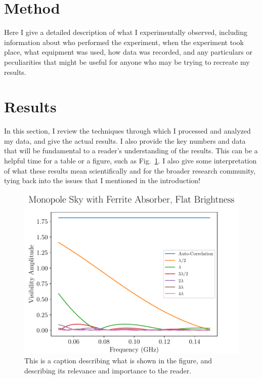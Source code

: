 \documentclass[11pt]{article}
\begin{document}
\section{Method}

Here I give a detailed description of what I experimentally observed, including 
information about who performed the experiment, when the experiment took place, 
what equipment was used, how data was recorded, and any particulars or 
peculiarities that might be useful for anyone who may be trying to recreate my 
results.

\section{Results}

In this section, I review the techniques through which I processed and analyzed 
my data, and give the actual results. I also provide the key numbers and data 
that will be fundamental to a reader's understanding of the results. This can 
be a helpful time for a table or a figure, such as 
Fig.~\ref{fig:figure-example}.  I also give some interpretation of what these 
results mean scientifically and for the broader research community, tying back 
into the issues that I mentioned in the introduction!

\begin{figure}
    \begin{center}
    \includegraphics[width=\linewidth]{fig_example}
    \end{center}
    \caption{
        This is a caption describing what is shown in the figure, and 
        describing its relevance and importance to the reader.
    }
    \label{fig:figure-example}
\end{figure}
\end{document}
